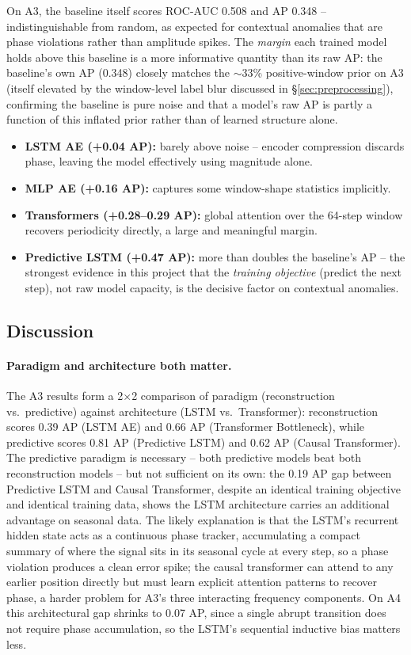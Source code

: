 On A3, the baseline itself scores ROC-AUC 0.508 and AP 0.348 -- indistinguishable from random, as expected for contextual anomalies that are phase violations rather than amplitude spikes. The \emph{margin} each trained model holds above this baseline is a more informative quantity than its raw AP: the baseline's own AP (0.348) closely matches the $\sim$33\% positive-window prior on A3 (itself elevated by the window-level label blur discussed in \S\ref{sec:preprocessing}), confirming the baseline is pure noise and that a model's raw AP is partly a function of this inflated prior rather than of learned structure alone.

\begin{itemize}
  \item \textbf{LSTM AE (+0.04 AP):} barely above noise -- encoder compression discards phase, leaving the model effectively using magnitude alone.
  \item \textbf{MLP AE (+0.16 AP):} captures some window-shape statistics implicitly.
  \item \textbf{Transformers (+0.28--0.29 AP):} global attention over the 64-step window recovers periodicity directly, a large and meaningful margin.
  \item \textbf{Predictive LSTM (+0.47 AP):} more than doubles the baseline's AP -- the strongest evidence in this project that the \emph{training objective} (predict the next step), not raw model capacity, is the decisive factor on contextual anomalies.
\end{itemize}

\subsection{Discussion}

\paragraph{Paradigm and architecture both matter.} The A3 results form a 2$\times$2 comparison of paradigm (reconstruction vs.\ predictive) against architecture (LSTM vs.\ Transformer): reconstruction scores 0.39 AP (LSTM AE) and 0.66 AP (Transformer Bottleneck), while predictive scores 0.81 AP (Predictive LSTM) and 0.62 AP (Causal Transformer). The predictive paradigm is necessary -- both predictive models beat both reconstruction models -- but not sufficient on its own: the 0.19 AP gap between Predictive LSTM and Causal Transformer, despite an identical training objective and identical training data, shows the LSTM architecture carries an additional advantage on seasonal data. The likely explanation is that the LSTM's recurrent hidden state acts as a continuous phase tracker, accumulating a compact summary of where the signal sits in its seasonal cycle at every step, so a phase violation produces a clean error spike; the causal transformer can attend to any earlier position directly but must learn explicit attention patterns to recover phase, a harder problem for A3's three interacting frequency components. On A4 this architectural gap shrinks to 0.07 AP, since a single abrupt transition does not require phase accumulation, so the LSTM's sequential inductive bias matters less.

